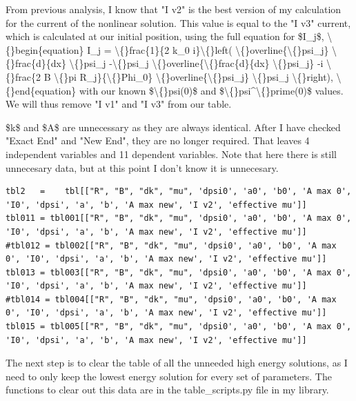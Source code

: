 \documentclass{article}
\begin{document}
From previous analysis, I know that "I v2" is the best version of my calculation for the current of the nonlinear solution. This value is equal to the "I v3" current, which is calculated at our initial position, using the full equation for \$I\_j\$,
\textbackslash\{\}begin\{equation\}
I\_j = \textbackslash\{\}frac\{1\}\{2 k\_0 i\}\textbackslash\{\}left( \textbackslash\{\}overline\{\textbackslash\{\}psi\_j\} \textbackslash\{\}frac\{d\}\{dx\} \textbackslash\{\}psi\_j -\textbackslash\{\}psi\_j \textbackslash\{\}overline\{\textbackslash\{\}frac\{d\}\{dx\} \textbackslash\{\}psi\_j\} -i \textbackslash\{\}frac\{2 B \textbackslash\{\}pi R\_j\}\{\textbackslash\{\}Phi\_0\} \textbackslash\{\}overline\{\textbackslash\{\}psi\_j\}  \textbackslash\{\}psi\_j  \textbackslash\{\}right),
\textbackslash\{\}end\{equation\}
with our known \$\textbackslash\{\}psi(0)\$ and \$\textbackslash\{\}psi\textasciicircum{}\textbackslash\{\}prime(0)\$ values. We will thus remove "I v1" and "I v3" from our table. 

\$k\$ and \$A\$ are unnecessary as they are always identical. After I have checked "Exact End" and "New End", they are no longer required. That leaves 4 independent variables and 11 dependent variables. Note that here there is still unnecesary data, but at this point I don't know it is unnecesary.

\begin{lstlisting}
tbl2   =    tbl[["R", "B", "dk", "mu", 'dpsi0', 'a0', 'b0', 'A max 0', 'I0', 'dpsi', 'a', 'b', 'A max new', 'I v2', 'effective mu']]
tbl011 = tbl001[["R", "B", "dk", "mu", 'dpsi0', 'a0', 'b0', 'A max 0', 'I0', 'dpsi', 'a', 'b', 'A max new', 'I v2', 'effective mu']]
#tbl012 = tbl002[["R", "B", "dk", "mu", 'dpsi0', 'a0', 'b0', 'A max 0', 'I0', 'dpsi', 'a', 'b', 'A max new', 'I v2', 'effective mu']]
tbl013 = tbl003[["R", "B", "dk", "mu", 'dpsi0', 'a0', 'b0', 'A max 0', 'I0', 'dpsi', 'a', 'b', 'A max new', 'I v2', 'effective mu']]
#tbl014 = tbl004[["R", "B", "dk", "mu", 'dpsi0', 'a0', 'b0', 'A max 0', 'I0', 'dpsi', 'a', 'b', 'A max new', 'I v2', 'effective mu']]
tbl015 = tbl005[["R", "B", "dk", "mu", 'dpsi0', 'a0', 'b0', 'A max 0', 'I0', 'dpsi', 'a', 'b', 'A max new', 'I v2', 'effective mu']]\end{lstlisting}

The next step is to clear the table of all the unneeded high energy solutions, as I need to only keep the lowest energy solution for every set of parameters. The functions to clear out this data are in the table\_scripts.py file in my library.
\end{document}
